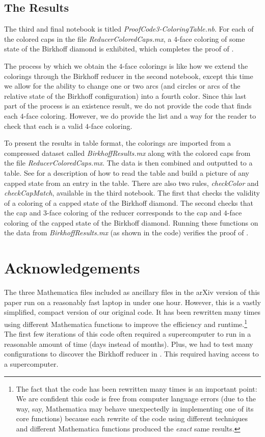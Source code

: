 \documentclass[12pt]{amsart}
\theoremstyle{definition}
\theoremstyle{remark}
\numberwithin{equation}{section}
\begin{document}
\subsection{The Results}\label{section:results}
The third and final  notebook is titled \emph{ProofCode3-ColoringTable.nb}.  For each of the colored caps in the file \emph{ReducerColoredCaps.mx}, a $4$-face coloring of some state of the Birkhoff diamond is exhibited, which completes the proof of . 

The process by which we obtain the $4$-face colorings is like how we extend the colorings through the Birkhoff reducer in the second notebook, except this time we allow for the ability to change one or two arcs (and circles or arcs of the relative state of the Birkhoff configuration) into a fourth color.  Since this last part of the process is an existence result, we do not provide the code that finds each $4$-face coloring. However, we do provide the list and a way for the reader to check that each is a valid $4$-face coloring.

To present the results in table format, the colorings are imported from a compressed dataset called \emph{BirkhoffResults.mx} along with the colored caps from the file \emph{ReducerColoredCaps.mx}.  The data is then combined and outputted to a table. See  for a description of how to read the table and build a picture of any capped state from an entry in the table. There are also two rules, \emph{checkColor} and \emph{checkCapMatch}, available in the third notebook. The first that checks the validity of a coloring of a capped state of the Birkhoff diamond. The second checks that the cap and $3$-face coloring of the reducer corresponds to the cap and $4$-face coloring of the capped state of the Birkhoff diamond. Running these functions on the data from  \emph{BirkhoffResults.mx} (as shown in the code) verifies the proof of . 


\section*{Acknowledgements} The three Mathematica files included as ancillary files in the arXiv version of this paper run on a reasonably fast laptop in under one hour.  However, this is a vastly simplified, compact version of our original code.  It has been rewritten many times using  different Mathematica functions to improve the efficiency and runtime.\footnote{The fact that the code has been rewritten many times is an important point: We are confident this code is free from computer language errors (due to the way, say, Mathematica may behave unexpectedly in implementing one of its core functions) because each rewrite of the code using different techniques and different Mathematica functions produced the {\em exact} same results.}  The first few iterations of this code often required a supercomputer to run in a reasonable amount of time (days instead of  months).  Plus, we had to test many configurations to discover the Birkhoff reducer in . This  required having access to a supercomputer.
\end{document}
